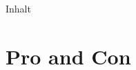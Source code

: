 \documentclass{beamer}
\begin{document}
\begin{frame}
  \titlepage
\end{frame}

\begin{frame}{Inhalt}
  \tableofcontents
\end{frame}

\section{Pro and Con}


\end{document}
